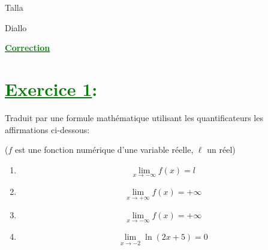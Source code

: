 \documentclass[12pt]{article}
\begin{document}
\begin{minipage}{0.8\textwidth}
	Talla                        
\end{minipage}
\begin{minipage}{0.8\textwidth}
	Diallo 
\end{minipage}

\begin{center}
\textbf{{\underline{\textcolor{green}{Correction}}}}
\end{center}
\section*{\textcolor{green}{\underline{Exercice 1}:}}
Traduit par une formule mathématique utilisant les quantificateurs les affirmations ci-dessous:

($f$ est une fonction numérique d'une variable réelle, $\ell$ un réel)
\begin{enumerate}
\item \[\lim_{x \to -\infty} f(x) = l\]

\item \[\lim_{x \to +\infty} f(x) = +\infty\]

\item \[\lim_{x \to -\infty} f(x) = +\infty\]

\item \[\lim_{x \to -2} \ln(2x+5) = 0\]

\end{enumerate}
\end{document}

